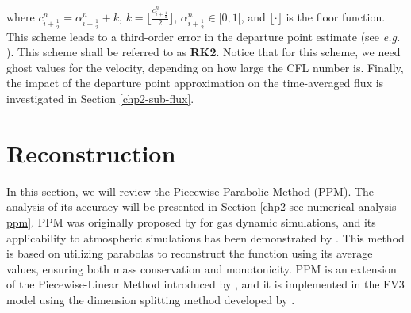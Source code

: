 where $c_{i+\frac{1}{2}}^n = \alpha_{i+\frac{1}{2}}^n + k$, 
$k=\lfloor \frac{c_{i+\frac{1}{2}}^n}{2} \rfloor$, $\alpha_{i+\frac{1}{2}}^n \in [0,1[$, and $\lfloor \cdot \rfloor$ is
the floor function. This scheme leads to a third-order error in the departure point estimate (see \textit{e.g.} 
\citet[Section 7.1.2]{durran:2010}). This scheme shall be referred to as \textbf{RK2}. 
Notice that for this scheme, we need ghost values for the velocity, depending on how large the CFL number is.
Finally, the impact of the departure point approximation on the time-averaged flux is investigated in 
Section \ref{chp2-sub-flux}.

\section{Reconstruction}
\label{chp2-sec-recon}
In this section, we will review the Piecewise-Parabolic Method (PPM). 
The analysis of its accuracy will be presented in Section \ref{chp2-sec-numerical-analysis-ppm}.
PPM was originally proposed by \citet{colella:1984} for gas dynamic simulations, and its applicability
to atmospheric simulations has been demonstrated by \citet{carpenter:1990}. 
This method is based on utilizing parabolas to reconstruct the function using its average values,
ensuring both mass conservation and monotonicity. PPM is an extension of the Piecewise-Linear Method 
introduced by \citet{vanleer:1977}, and it is implemented in the FV3 model using the dimension
splitting method developed by \citet{lin:1996}.

